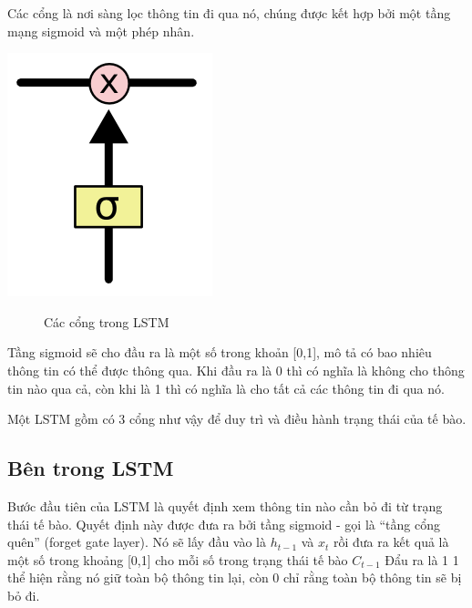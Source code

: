 Các cổng là nơi sàng lọc thông tin đi qua nó, chúng được kết hợp bởi một tầng mạng sigmoid và một phép nhân.
\begin{center}
    \includegraphics[scale=.3]{image/chapter6/yn2.png}
    \begin{figure}[htp]
    \begin{center}
     
    \end{center}
    \caption{Các cổng trong LSTM}
    \end{figure}
\end{center}
Tầng sigmoid sẽ cho đầu ra là một số trong khoản [0,1], mô tả có bao nhiêu thông tin có thể được thông qua. Khi đầu ra là 0 thì có nghĩa là không cho thông tin nào qua cả, còn khi là 1 thì có nghĩa là cho tất cả các thông tin đi qua nó.

Một LSTM gồm có 3 cổng như vậy để duy trì và điều hành trạng thái của tế bào.
\subsection{Bên trong LSTM}
Bước đầu tiên của LSTM là quyết định xem thông tin nào cần bỏ đi từ trạng thái tế bào. Quyết định này được đưa ra bởi tầng sigmoid - gọi là “tầng cổng quên” (forget gate layer). Nó sẽ lấy đầu vào là $h_{t-1}$ và $x_{t}$ rồi đưa ra kết quả là một số trong khoảng [0,1] cho mỗi số trong trạng thái tế bào $C_{t-1}$ Đẩu ra là 1 1 thể hiện rằng nó giữ toàn bộ thông tin lại, còn 0 chỉ rằng toàn bộ thông tin sẽ bị bỏ đi.

